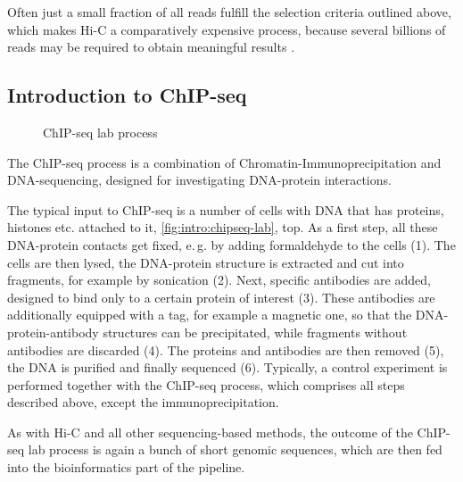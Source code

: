 Often just a small fraction of all reads fulfill the selection criteria outlined above,
which makes Hi-C a comparatively expensive process, because several billions
of reads may be required to obtain meaningful results \cite{Rao2014}.

\subsection{Introduction to ChIP-seq} \label{sec:intro:chipseq}
\begin{wrapfigure}[22]{l}{0.3\textwidth}
 \caption{ChIP-seq lab process}
 \label{fig:intro:chipseq-lab}
\end{wrapfigure}
The ChIP-seq process is a combination of Chromatin-Immunoprecipitation and DNA-sequencing, 
designed for investigating DNA-protein interactions.

The typical input to ChIP-seq is a number of cells with DNA that has proteins, histones etc. attached to
it, \autoref{fig:intro:chipseq-lab}, top. 
As a first step, all these DNA-protein contacts get fixed, 
e.\,g. by adding formaldehyde to the cells (1).
The cells are then lysed, the DNA-protein structure is extracted and cut into fragments, 
for example by sonication (2).
Next, specific antibodies are added, designed to bind only to a certain protein of interest (3).
These antibodies are additionally equipped with a tag, for example a magnetic one, so that 
the DNA-protein-antibody structures can be precipitated, while fragments without antibodies are discarded (4).
The proteins and antibodies are then removed (5), 
the DNA is purified and finally sequenced (6).
Typically, a control experiment is performed together with the ChIP-seq process, 
which comprises all steps described above, except the immunoprecipitation.

As with Hi-C and all other sequencing-based methods, the outcome of the ChIP-seq lab process is
again a bunch of short genomic sequences, which are then fed into the bioinformatics part of the pipeline.

